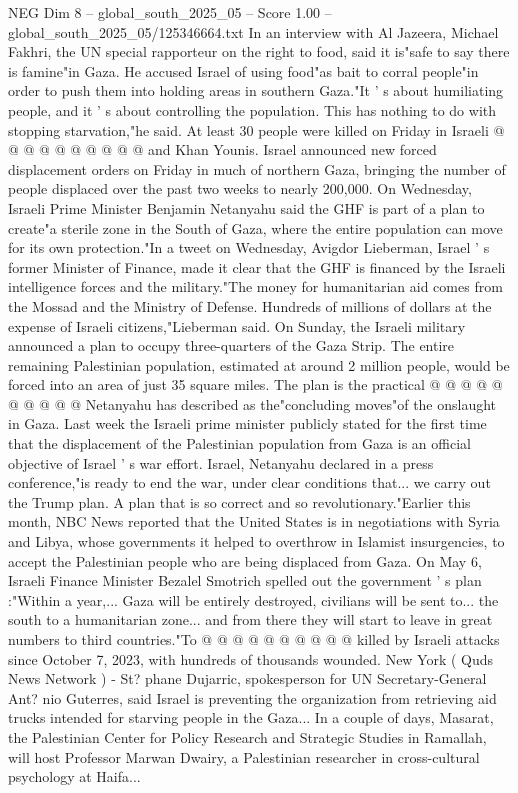 \begin{textsample}{NEG Dim 8 – global\_south\_2025\_05 – Score 1.00 – global\_south\_2025\_05/125346664.txt}
In an interview with Al Jazeera, Michael Fakhri, the UN special rapporteur on the right to food, said it is"safe to say there is famine"in Gaza.
He accused Israel of using food"as bait to corral people"in order to push them into holding areas in southern Gaza."It ' s about humiliating people, and it ' s about controlling the population.
This has nothing to do with stopping starvation,"he said.
At least 30 people were killed on Friday in Israeli @ @ @ @ @ @ @ @ @ @ and Khan Younis.
Israel announced new forced displacement orders on Friday in much of northern Gaza, bringing the number of people displaced over the past two weeks to nearly 200,000.
On Wednesday, Israeli Prime Minister Benjamin Netanyahu said the GHF is part of a plan to create"a sterile zone in the South of Gaza, where the entire population can move for its own protection."In a tweet on Wednesday, Avigdor Lieberman, Israel ' s former Minister of Finance, made it clear that the GHF is financed by the Israeli intelligence forces and the military."The money for humanitarian aid comes from the Mossad and the Ministry of Defense.
Hundreds of millions of dollars at the expense of Israeli citizens,"Lieberman said.
On Sunday, the Israeli military announced a plan to occupy three-quarters of the Gaza Strip.
The entire remaining Palestinian population, estimated at around 2 million people, would be forced into an area of just 35 square miles.
The plan is the practical @ @ @ @ @ @ @ @ @ @ Netanyahu has described as the"concluding moves"of the onslaught in Gaza.
Last week the Israeli prime minister publicly stated for the first time that the displacement of the Palestinian population from Gaza is an official objective of Israel ' s war effort.
Israel, Netanyahu declared in a press conference,"is ready to end the war, under clear conditions that... we carry out the Trump plan.
A plan that is so correct and so revolutionary."Earlier this month, NBC News reported that the United States is in negotiations with Syria and Libya, whose governments it helped to overthrow in Islamist insurgencies, to accept the Palestinian people who are being displaced from Gaza.
On May 6, Israeli Finance Minister Bezalel Smotrich spelled out the government ' s plan :"Within a year,...
Gaza will be entirely destroyed, civilians will be sent to... the south to a humanitarian zone... and from there they will start to leave in great numbers to third countries."To @ @ @ @ @ @ @ @ @ @ killed by Israeli attacks since October 7, 2023, with hundreds of thousands wounded.
New York ( Quds News Network ) - St? phane Dujarric, spokesperson for UN Secretary-General Ant? nio Guterres, said Israel is preventing the organization from retrieving aid trucks intended for starving people in the Gaza...
In a couple of days, Masarat, the Palestinian Center for Policy Research and Strategic Studies in Ramallah, will host Professor Marwan Dwairy, a Palestinian researcher in cross-cultural psychology at Haifa...

\end{textsample}
